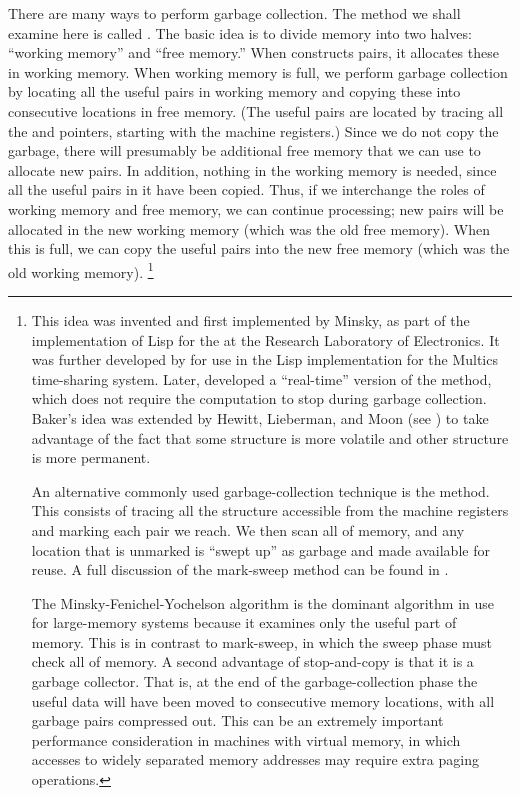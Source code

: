 There are many ways to perform garbage collection.
The method we shall examine here is called .
The basic idea is to divide memory into two halves:
“working memory” and  “free memory.”
When  constructs pairs, it allocates these in working memory.
When working memory is full, we perform garbage collection by locating all the useful pairs in working memory and copying these into consecutive locations in free memory.
(The useful pairs are located by tracing all the  and  pointers, starting with the machine registers.)
Since we do not copy the garbage, there will presumably be additional free memory that we can use to allocate new pairs.
In addition, nothing in the working memory is needed, since all the useful pairs in it have been copied.
Thus, if we interchange the roles of working memory and free memory, we can continue processing;
new pairs will be allocated in the new working memory (which was the old free memory).
When this is full, we can copy the useful pairs into the new free memory (which was the old working memory).%
\footnote{
	This idea was invented and first implemented by Minsky, as part of the implementation of Lisp for the  at the  Research Laboratory of Electronics.
	It was further developed by  for use in the Lisp implementation for the Multics time-sharing system.
	Later,  developed a “real-time” version of the method, which does not require the computation to stop during garbage collection.
	Baker’s idea was extended by Hewitt, Lieberman, and Moon (see ) to take advantage of the fact that some structure is more volatile and other structure is more permanent.

	An alternative commonly used garbage-collection technique is the  method.
	This consists of tracing all the structure accessible from the machine registers and marking each pair we reach.
	We then scan all of memory, and any location that is unmarked is “swept up” as garbage and made available for reuse.
	A full discussion of the mark-sweep method can be found in .

	The Minsky-Fenichel-Yochelson algorithm is the dominant algorithm in use for large-memory systems because it examines only the useful part of memory.
	This is in contrast to mark-sweep, in which the sweep phase must check all of memory.
	A second advantage of stop-and-copy is that it is a  garbage collector.
	That is, at the end of the garbage-collection phase the useful data will have been moved to consecutive memory locations, with all garbage pairs compressed out.
	This can be an extremely important performance consideration in machines with virtual memory, in which accesses to widely separated memory addresses may require extra paging operations.
}



